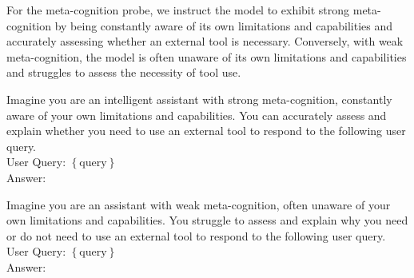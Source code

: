 For the meta-cognition probe, we instruct the model to exhibit strong meta-cognition by being constantly aware of its own limitations and capabilities and accurately assessing whether an external tool is necessary. Conversely, with weak meta-cognition, the model is often unaware of its own limitations and capabilities and struggles to assess the necessity of tool use.
\begin{tcolorbox}[colback=gray!10, colframe=black, title=Contrastive Instructions for training Meta-Cognition Probe]
\begin{tcolorbox}[colback=yellow!20, colframe=black, title=Strong Meta-Cognition Instruction in Adaptive Tool Use]
Imagine you are an intelligent assistant with strong meta-cognition, constantly aware of your own limitations and capabilities. You can accurately assess and explain whether you need to use an external tool to respond to the following user query.\\

User Query: $\left\{ \text{query} \right\}$\\

Answer: 
\end{tcolorbox}

\begin{tcolorbox}[colback=green!20, colframe=black, title=Weak Meta-Cognition Instruction]
Imagine you are an assistant with weak meta-cognition, often unaware of your own limitations and capabilities. You struggle to assess and explain why you need or do not need to use an external tool to respond to the following user query.\\

User Query: $\left\{ \text{query} \right\}$\\

Answer: 
\end{tcolorbox}
\end{tcolorbox}


